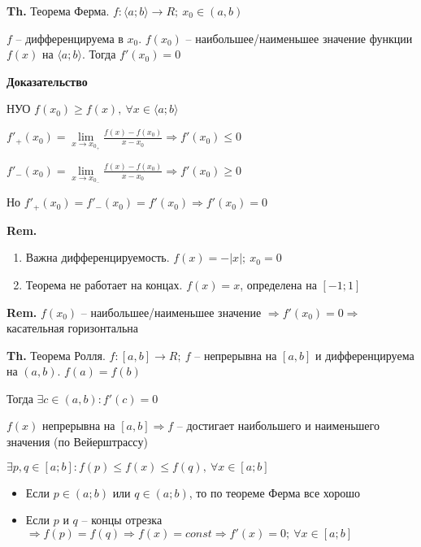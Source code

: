\documentclass[14pt, letter paper]{article}
\newcommand{\q}[1]{\langle #1 \rangle}
\begin{document}
\textbf{Th.} Теорема Ферма. $f : \q{a; b} \rightarrow R;\ x_0 \in (a, b)$

$f$ -- дифференцируема в $x_0$. $f(x_0)$ -- наибольшее/наименьшее значение функции $f(x)$ на $\q{a; b}$. Тогда $f'(x_0) = 0$

\begin{center}
    \textbf{Доказательство}
\end{center}

НУО $f(x_0) \geq f(x),\ \forall x \in \q{a; b}$

$f'_+(x_0) = \lim\limits_{x \rightarrow x_{0_+}} \frac{f(x) - f(x_0)}{x - x_0} \Rightarrow f'(x_0) \leq 0$

$f'_-(x_0) = \lim\limits_{x \rightarrow x_{0_-}} \frac{f(x) - f(x_0)}{x - x_0} \Rightarrow f'(x_0) \geq 0$

Но $f'_+(x_0) = f'_-(x_0) = f'(x_0) \Rightarrow f'(x_0) = 0$

\textbf{Rem.} 

\begin{enumerate}
    \item Важна дифференцируемость. $f(x) = -|x|;\ x_0 = 0$
    \item Теорема не работает на концах. $f(x) = x$, определена на $[-1; 1]$
\end{enumerate}

\textbf{Rem.} $f(x_0)$ -- наибольшее/наименьшее значение $\Rightarrow f'(x_0) = 0 \Rightarrow$ касательная горизонтальна

\vspace{5mm}

\textbf{Th.} Теорема Ролля. $f : [a, b] \rightarrow R;\ f$ -- непрерывна на $[a, b]$ и дифференцируема на $(a, b)$. $f(a) = f(b)$

Тогда $\exists c \in (a, b) : f'(c) = 0$

$f(x)$ непрерывна на $[a, b] \Rightarrow f$ -- достигает наибольшего и наименьшего значения (по Вейерштрассу)
    
$\exists p, q \in [a; b] : f(p) \leq f(x) \leq f(q),\ \forall x \in [a; b]$

\begin{itemize}
    \item Если $p \in (a; b)$ или $q \in (a;b)$, то по теореме Ферма все хорошо 
    \item Если $p$ и $q$ -- концы отрезка $\Rightarrow f(p) = f(q) \Rightarrow f(x) = const \Rightarrow f'(x) = 0;\ \forall x \in [a;b]$
\end{itemize}
\end{document}
